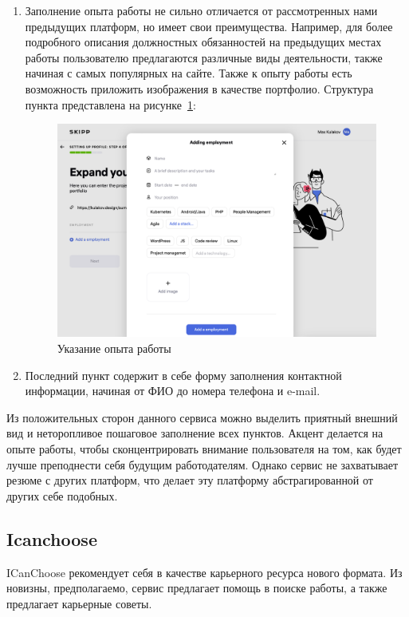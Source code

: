 \documentclass[master, och, pract]{SCWorks}
\begin{document}
\begin{enumerate}
    \item Заполнение опыта работы не сильно отличается от рассмотренных 
    нами предыдущих платформ, но имеет свои преимущества. Например, 
    для более подробного описания должностных обязанностей на предыдущих 
    местах работы пользователю предлагаются различные виды деятельности, 
    также начиная с самых популярных на сайте. Также к опыту работы есть возможность 
    приложить изображения в качестве портфолио. Структура пункта представлена 
    на рисунке~\ref{fig:12}:
    \begin{figure}[!ht]
        \centering
        \includegraphics[width=12cm]{images/image17.png}
        \caption{\label{fig:12}%
            Указание опыта работы}
    \end{figure}

    \item Последний пункт содержит в себе форму заполнения контактной информации, 
    начиная от ФИО до номера телефона и e-mail. 
\end{enumerate}

Из положительных сторон данного сервиса можно выделить приятный внешний вид 
и неторопливое пошаговое заполнение всех пунктов. Акцент делается на опыте работы, 
чтобы сконцентрировать внимание пользователя на том, как будет лучше преподнести 
себя будущим работодателям. Однако сервис не захватывает резюме с других платформ, 
что делает эту платформу абстрагированной от других себе подобных.

\subsection{Icanchoose}
ICanChoose рекомендует себя в качестве карьерного ресурса нового формата. Из новизны, 
предполагаемо, сервис предлагает помощь в поиске работы, а также предлагает карьерные советы.
\end{document}
